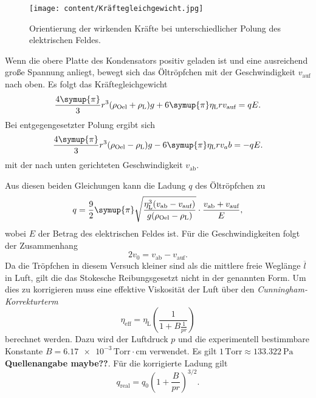 \begin{figure}
    \centering
    \texttt{[image: content/Kräftegleichgewicht.jpg]}
    \caption{Orientierung der wirkenden Kräfte bei unterschiedlicher Polung des elektrischen Feldes. \cite{v503}}
    \label{fig:Kraeftegleichgewicht}
\end{figure}

Wenn die obere Platte des Kondensators positiv geladen ist und eine ausreichend große Spannung anliegt, bewegt sich das Öltröpfchen mit der Geschwindigkeit $v_\text{auf}$
nach oben. 
Es folgt das Kräftegleichgewicht
\begin{equation*}
    \label{eqn:Kraefte_1}
    \frac{4\symup{\pi}}{3}r^3(\rho_\text{Oel} + \rho_\text{L})g + 6 \symup{\pi} \eta_\text{L}r v_\text{auf} = qE.
\end{equation*}
Bei entgegengesetzter Polung ergibt sich 
\begin{equation*}
    \label{eqn:Kraefte_2}
    \frac{4\symup{\pi}}{3}r^3(\rho_\text{Oel}- \rho_\text{L})g - 6 \symup{\pi} \eta_\text{L}r v_ab = -qE.
\end{equation*}
mit der nach unten gerichteten Geschwindigkeit $v_\text{ab}$.

Aus diesen beiden Gleichungen kann die Ladung $q$ des Öltröpfchen zu 
\begin{equation}
    \label{eqn:q}
    q = \frac{9}{2} \symup{\pi} \sqrt{\frac{\eta_\text{L}^3(v_\text{ab} - v_\text{auf})}{g(\rho_\text{Oel}- \rho_\text{L})}} \cdot \frac{v_\text{ab} + v_\text{auf}}{E},
\end{equation}
wobei $E$ der Betrag des elektrischen Feldes ist. Für die Geschwindigkeiten folgt der Zusammenhang
\begin{equation}
    \label{eqn:v_0}
    2v_0 = v_\text{ab} - v_\text{auf}.
\end{equation}    
Da die Tröpfchen in diesem Versuch kleiner sind als die mittlere freie Weglänge $\overline{l}$ in Luft, gilt die das Stokesche Reibungsgesetzt nicht in der genannten Form.
Um dies zu korrigieren muss eine effektive Viskosität der Luft über den \textit{Cunningham-Korrekturterm}
\begin{equation}
    \label{eqn:n_eff}
    \eta_\text{eff} = \eta_\text{L} \left(\frac{1}{1 + B \frac{1}{pr}}\right)
\end{equation}
berechnet werden. Dazu wird der Luftdruck $p$ und die experimentell bestimmbare Konstante $B =  \num{6.17e-3}\, \text{Torr}\cdot\unit{\centi\metre}$ \cite{v503} verwendet.
Es gilt $1\,\text{Torr} \approx \qty{133.322}{\pascal}$ \textbf{Quellenangabe maybe??}.
Für die korrigierte Ladung gilt
\begin{equation}
    \label{eqn:q_korrigiert}
    q_\text{real} = q_0 \left(1+ \frac{B}{pr}\right)^{3/2}.
\end{equation}
